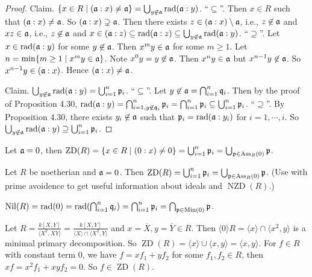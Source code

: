 \begin{proof}
    Claim. $\{x \in R \mid (\mathfrak{a}:x) \neq \mathfrak{a}\} = \bigcup_{y \not\in \mathfrak{a}} \operatorname{rad}(\mathfrak{a}:y)$. ``$\subseteq$''. Then $x \in R$ such that $(\mathfrak{a}:x) \neq \mathfrak{a}$. So $(\mathfrak{a}:x) \supsetneq \mathfrak{a}$. Then there exists $z \in (\mathfrak{a}:x) \setminus \mathfrak{a}$, i.e., $z \not \in \mathfrak{a}$ and $xz \in \mathfrak{a}$, i.e., $z \not \in \mathfrak{a}$ and $x \in (\mathfrak{a}:z) \subseteq \operatorname{rad}(\mathfrak{a}:z) \subseteq \bigcup_{y \not\in \mathfrak{a}} \operatorname{rad}(\mathfrak{a}:y)$. ``$\supseteq$''. Let $x \in \operatorname{rad}(\mathfrak{a}:y)$ for some $y \not\in \mathfrak{a}$. Then $x^{m}y \in \mathfrak{a}$ for some $m \geq 1$. Let $n = \min\{m \geq 1 \mid x^{m}y \in \mathfrak{a}\}$. Note $x^{0}y = y \not \in \mathfrak{a}$. Then $x^{n}y \in \mathfrak{a}$ but $x^{n-1}y \not \in \mathfrak{a}$. So $x^{n-1}y \in (\mathfrak{a}:x)$. Hence $(\mathfrak{a}:x) \neq \mathfrak{a}$. \par
    Claim. $\bigcup_{y \not\in \mathfrak{a}} \operatorname{rad}(\mathfrak{a}:y) = \bigcup_{i=1}^{n}\mathfrak{p}_i$. ``$\subseteq$''. Let $y \not\in \mathfrak{a} = \bigcap_{i=1}^{n} \mathfrak{q}_i$. Then by the proof of Proposition 4.30, $\operatorname{rad}(\mathfrak{a}:y) = \bigcap_{i=1,y \not \in \mathfrak{q}_i}^{n} \mathfrak{p}_i = \bigcap_{i=1}^{n} \mathfrak{p}_i \subseteq \bigcup_{i=1}^{n}\mathfrak{p}_i$. ``$\supseteq$''. By Proposition 4.30, there exists $y_i \not \in \mathfrak{a}$ such that $\mathfrak{p}_i = \operatorname{rad}(\mathfrak{a}:y_i)$ for $i = 1,\cdots,i$. So $\bigcup_{y \not\in \mathfrak{a}} \operatorname{rad}(\mathfrak{a}:y) \supseteq \bigcup_{i=1}^{n} \mathfrak{p}_i$. 
\end{proof}

\begin{corollary}
    Let $\mathfrak{a} = 0$, then $\operatorname{ZD}(R) = \{x \in R \mid (0:x) \neq 0\} = \bigcup_{i=1}^{n} \mathfrak{p}_i = \bigcup_{\mathfrak{p} \in \operatorname{Ass}_R(0)}\mathfrak{p}$.
\end{corollary}

\begin{summary}
    Let $R$ be noetherian and $\mathfrak{a} = 0$. Then $\operatorname{ZD}(R) = \bigcup_{i=1}^{n} \mathfrak{p}_i = \bigcup_{\mathfrak{p} \in \operatorname{Ass}_R(0)}\mathfrak{p}$. (Use with prime avoidence to get useful information about ideals and $\operatorname{NZD}(R)$.) \par 
    $\operatorname{Nil}(R) = \operatorname{rad}(0) = \operatorname{rad}(\bigcap_{i=1}^{n}\mathfrak{q}_i) = \bigcap_{i=1}^{n} \mathfrak{p}_i = \bigcap_{\mathfrak{p} \in \operatorname{Min}(0)} \mathfrak{p}$.
\end{summary}

\begin{example*}
    Let $R = \frac{k[X,Y]}{\langle X^{2},XY \rangle} = \frac{k[X,Y]}{\langle X \rangle \cap \langle X^{2},Y \rangle}$ and $x = \overbar{X}, y= \overbar{Y} \in R$. Then $\langle 0 \rangle R = \langle x \rangle \cap \langle x^{2}, y \rangle$ is a minimal primary decomposition. So $\operatorname{ZD}(R) = \langle x \rangle \cup \langle x, y \rangle = \langle x, y \rangle$. For $f \in R$ with constant term 0, we have $f = xf_1 + yf_2$ for some $f_1,f_2 \in R$, then $xf = x^{2}f_1 + xyf_2 = 0$. So $f \in \operatorname{ZD}(R)$.
\end{example*}

